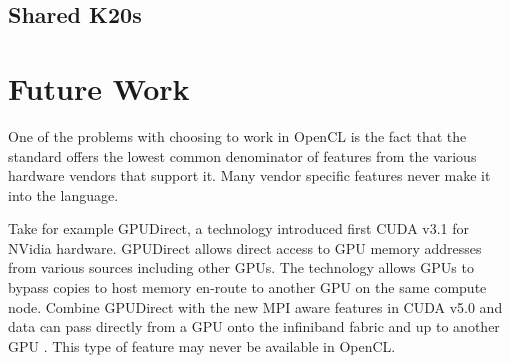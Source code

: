 \documentclass{report}
\begin{document}
\subsection{Shared K20s}



\section{Future Work}

One of the problems with choosing to work in OpenCL is the fact that the standard offers the lowest common denominator of features from the various hardware vendors that support it. Many vendor specific features never make it into the language. 

Take for example GPUDirect, a technology introduced first CUDA v3.1 for NVidia hardware. GPUDirect allows direct access to GPU memory addresses from various sources including other GPUs. The technology allows GPUs to bypass copies to host memory en-route to another GPU on the same compute node. Combine GPUDirect with the new MPI aware features in CUDA v5.0 and data can pass directly from a GPU onto the infiniband fabric and up to another GPU \cite{NvidiaGPUMPI}. This type of feature may never be available in OpenCL. 




\ifstandalone


\end{document}
